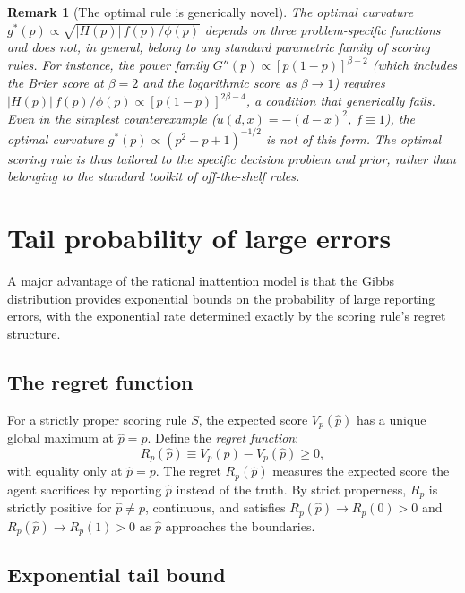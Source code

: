 \documentclass[11pt]{article}
\newtheorem{remark}{Remark}
\begin{document}
\begin{remark}[The optimal rule is generically novel]\label{rem:novel}
The optimal curvature $g^*(p) \propto \sqrt{|H(p)|\,f(p)/\phi(p)}$ depends on three problem-specific functions and does not, in general, belong to any standard parametric family of scoring rules. For instance, the power family $G''(p) \propto [p(1-p)]^{\beta-2}$ (which includes the Brier score at $\beta = 2$ and the logarithmic score as $\beta \to 1$) requires $|H(p)|\,f(p)/\phi(p) \propto [p(1-p)]^{2\beta-4}$, a condition that generically fails. Even in the simplest counterexample ($u(d,x) = -(d-x)^2$, $f \equiv 1$), the optimal curvature $g^*(p) \propto (p^2 - p + 1)^{-1/2}$ is not of this form. The optimal scoring rule is thus tailored to the specific decision problem and prior, rather than belonging to the standard toolkit of off-the-shelf rules.
\end{remark}


\section{Tail probability of large errors}\label{sec:ri-tail}

A major advantage of the rational inattention model is that the Gibbs distribution provides exponential bounds on the probability of large reporting errors, with the exponential rate determined exactly by the scoring rule's regret structure.

\subsection{The regret function}

For a strictly proper scoring rule $S$, the expected score $V_p(\hat{p})$ has a unique global maximum at $\hat{p} = p$. Define the \emph{regret function}:
\begin{equation}\label{eq:regret}
R_p(\hat{p}) \equiv V_p(p) - V_p(\hat{p}) \geq 0,
\end{equation}
with equality only at $\hat{p} = p$. The regret $R_p(\hat{p})$ measures the expected score the agent sacrifices by reporting $\hat{p}$ instead of the truth. By strict properness, $R_p$ is strictly positive for $\hat{p} \neq p$, continuous, and satisfies $R_p(\hat{p}) \to R_p(0) > 0$ and $R_p(\hat{p}) \to R_p(1) > 0$ as $\hat{p}$ approaches the boundaries.

\subsection{Exponential tail bound}
\end{document}
